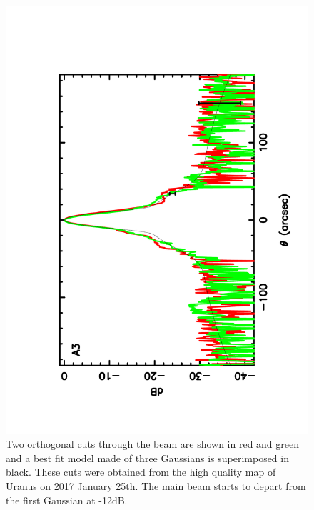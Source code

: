\begin{figure}
\begin{center}
\includegraphics[clip, angle=-90, scale = 0.3]{Figures/Array_A3_dB.pdf}
\caption{Two orthogonal cuts through the beam are shown in red and green and a best fit model made
of three Gaussians is superimposed in black. These cuts were obtained from the high quality map of Uranus on 2017 January 25th.
The main beam starts to depart from the first Gaussian at -12dB. }
\label{fig:beam_dB3}
\end{center}
\end{figure}

